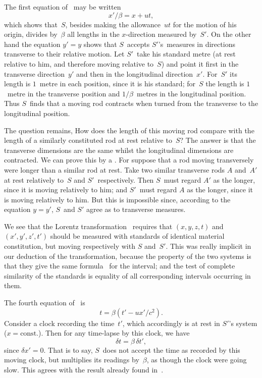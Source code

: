 \documentclass[12pt]{book}
\begin{document}
The first equation of~ may be written
\[
x'/\beta = x + ut,
\]
which shows that~$S$, besides making the allowance~$ut$ for the motion of his
origin, divides by~$\beta$ all lengths in the $x$-direction measured by~$S'$. On the
other hand the equation $y' = y$ shows that $S$~accepts $S'$'s~measures in directions
transverse to their relative motion. Let $S'$~take his standard metre
(at rest relative to him, and therefore moving relative to~$S$) and point it first
in the transverse direction~$y'$ and then in the longitudinal direction~$x'$. For~$S'$
its length is $1$~metre in each position, since it is his standard; for~$S$ the
length is $1$~metre in the transverse position and $1/\beta$~metres in the longitudinal
position. Thus $S$~finds that a moving rod contracts when turned from the
transverse to the longitudinal position.

The question remains, How does the length of this moving rod compare
with the length of a similarly constituted rod at rest relative to~$S$? The
answer is that the transverse dimensions are the same whilst the longitudinal
dimensions are contracted. We can prove this by a .
For suppose that a rod moving transversely were longer than a similar rod at
rest. Take two similar transverse rods $A$ and~$A'$ at rest relatively to~$S$ and
$S'$~respectively. Then $S$~must regard $A'$ as the longer, since it is moving
relatively to him; and $S'$~must regard $A$ as the longer, since it is moving
relatively to him. But this is impossible since, according to the equation
$y = y'$, $S$~and $S'$ agree as to transverse measures.

We see that the Lorentz transformation~ requires that $(x, y, z, t)$ and
$(x', y', z', t')$ should be measured with standards of identical material constitution,
but moving respectively with $S$ and~$S'$. This was really implicit in our
deduction of the transformation, because the property of the two systems
is that they give the same formula~ for the interval; and the test of
complete similarity of the standards is equality of all corresponding intervals
occurring in them.

The fourth equation of~ is
%
\[
t = \beta (t' - ux'/c^{2}).
\]
Consider a clock recording the time~$t'$, which accordingly is at rest in $S'$'s
system ($x = \text{const.}$). Then for any time-lapse by this clock, we have
\[
\delta t = \beta\, \delta t',
\]
since $\delta x' = 0$. That is to say, $S$~does not accept the time as recorded by this
moving clock, but multiplies its readings by~$\beta$, as though the clock were
going slow. This agrees with the result already found in~.
\end{document}
